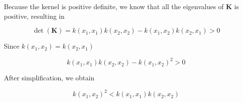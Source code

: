 \begin{solution}
    Because the kernel is positive definite, we know that all the eigenvalues of $\mathbf{K}$ is positive, resulting in

    \[
        \det(\mathbf{K}) = k(x_1, x_1)k(x_2, x_2) - k(x_1, x_2)k(x_2, x_1) > 0
    \]

    Since $k(x_1, x_2) = k(x_2, x_1)$

    \[
        k(x_1, x_1)k(x_2, x_2) - k(x_1, x_2)^2 > 0
    \]

    After simplification, we obtain

    \[
        k(x_1, x_2)^2 < k(x_1, x_1)k(x_2, x_2)
    \]

\end{solution}

\newpage